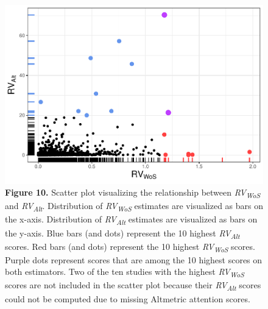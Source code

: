 \documentclass[
  man,floatsintext]{apa6}
\begin{document}
\begin{figure}
\centering
\includegraphics{RVcn_feasibility_in_social_neuroscience_files/figure-latex/fig10-1.pdf}
\caption{\label{fig:fig10}\textbf{Figure 10.} Scatter plot visualizing the relationship between \emph{RV\textsubscript{WoS}} and \emph{RV\textsubscript{Alt}}. Distribution of \emph{RV\textsubscript{WoS}} estimates are visualized as bars on the x-axis. Distribution of \emph{RV\textsubscript{Alt}} estimates are visualized as bars on the y-axis. Blue bars (and dots) represent the 10 highest \emph{RV\textsubscript{Alt}} scores. Red bars (and dots) represent the 10 highest \emph{RV\textsubscript{WoS}} scores. Purple dots represent scores that are among the 10 highest scores on both estimators. Two of the ten studies with the highest \emph{RV\textsubscript{WoS}} scores are not included in the scatter plot because their \emph{RV\textsubscript{Alt}} scores could not be computed due to missing Altmetric attention scores.}
\end{figure}
\end{document}
